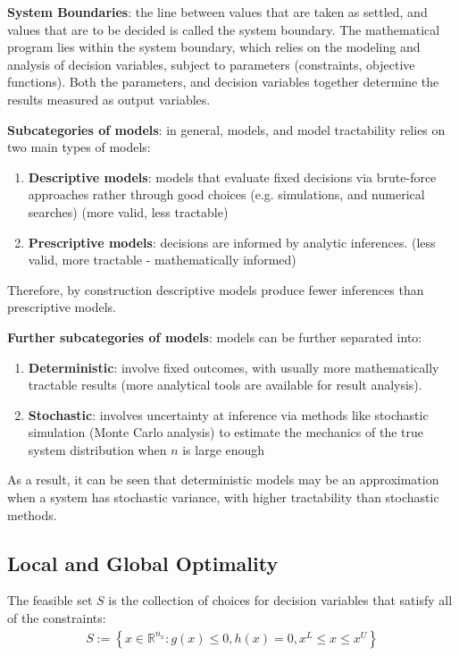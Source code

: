 \documentclass{article}
\begin{document}
\textbf{System Boundaries}: the line between values that are taken as settled, and values that are to be decided is called the system boundary. The mathematical program lies within the system boundary, which relies on the modeling and analysis of decision variables, subject to parameters (constraints, objective functions). Both the parameters, and decision variables together determine the results measured as output variables.

\textbf{Subcategories of models}: in general, models, and model tractability relies on two main types of models:
\begin{enumerate}
    \item \textbf{Descriptive models}: models that evaluate fixed decisions via brute-force approaches rather through good choices (e.g. simulations, and numerical searches) (more valid, less tractable)
    \item \textbf{Prescriptive models}: decisions are informed by analytic inferences. (less valid, more tractable - mathematically informed)
\end{enumerate}

Therefore, by construction descriptive models produce fewer inferences than prescriptive models.

\textbf{Further subcategories of models}: models can be further separated into:
\begin{enumerate}
    \item \textbf{Deterministic}: involve fixed outcomes, with usually more mathematically tractable results (more analytical tools are available for result analysis).
    \item \textbf{Stochastic}: involves uncertainty at inference via methods like stochastic simulation (Monte Carlo analysis) to estimate the mechanics of the true system distribution when \(n\) is large enough
\end{enumerate}

As a result, it can be seen that deterministic models may be an approximation when a system has stochastic variance, with higher tractability than stochastic methods.

\subsection{Local and Global Optimality}

The feasible set \(S\) is the collection of choices for decision variables that satisfy all of the constraints:
\begin{align*}
S := \left\{ x \in \mathbb{R}^{n_x} : g \left(x\right) \leq 0, h\left(x\right) = 0, x^L \leq x \leq x^U\right\}
\end{align*}
\end{document}
